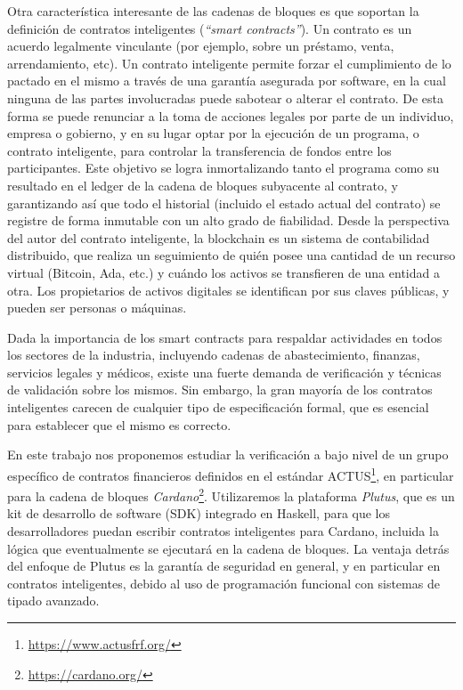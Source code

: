\documentclass[12pt]{book}
\begin{document}
Otra característica interesante de las cadenas de bloques es que soportan la definición de contratos inteligentes (\textit{``smart contracts''}).
Un contrato es un acuerdo legalmente vinculante (por ejemplo, sobre un préstamo, venta, arrendamiento, etc). Un contrato inteligente permite forzar el cumplimiento de lo pactado en el mismo a través de una garantía asegurada por software, en la cual ninguna de las partes involucradas puede sabotear o alterar el contrato. De esta forma se puede renunciar a la toma de acciones legales por parte de un individuo, empresa o gobierno, y en su lugar optar por la ejecución de un programa, o contrato inteligente, para controlar la transferencia de fondos entre los participantes.
Este objetivo se logra inmortalizando tanto el programa como su resultado en el ledger de la cadena de bloques subyacente al contrato, y garantizando así que todo el historial (incluido el estado actual del contrato) se registre de forma inmutable con un alto grado de fiabilidad. Desde la perspectiva del autor del contrato inteligente, la blockchain es un sistema de contabilidad distribuido, que realiza un seguimiento de quién posee una cantidad de un recurso virtual (Bitcoin, Ada, etc.) y cuándo los activos se transfieren de una entidad a otra. Los propietarios de activos digitales se identifican por sus claves públicas, y pueden ser personas o máquinas.

Dada la importancia de los smart contracts para respaldar actividades en todos los sectores de la industria, incluyendo cadenas de abastecimiento, finanzas, servicios legales y médicos, existe una fuerte demanda de verificación y técnicas de validación sobre los mismos. Sin embargo, la gran mayoría de los contratos inteligentes carecen de cualquier tipo de especificación formal, que es esencial para establecer que el mismo es correcto.

En este trabajo nos proponemos estudiar la verificación a bajo nivel de un grupo específico de contratos financieros definidos en el estándar ACTUS\footnote{\href{https://www.actusfrf.org/}{https://www.actusfrf.org/}}, en particular para la cadena de bloques \textit{Cardano}\footnote{\href{https://cardano.org/}{https://cardano.org/}}. 
Utilizaremos la plataforma \textit{Plutus}, que es un kit de desarrollo de software (SDK) integrado en Haskell, para que los desarrolladores puedan escribir contratos inteligentes para Cardano, incluida la lógica que eventualmente se ejecutará en la cadena de bloques. La ventaja detrás del enfoque de Plutus es la garantía de seguridad en general, y en particular en contratos inteligentes, debido al uso de programación funcional con sistemas de tipado avanzado. 
\end{document}
